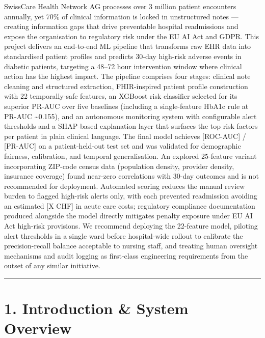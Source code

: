 \documentclass[11pt,a4paper]{article}
\begin{document}
SwissCare Health Network AG processes over 3 million patient encounters annually, yet 70\% of clinical information is locked in unstructured notes --- creating information gaps that drive preventable hospital readmissions and expose the organisation to regulatory risk under the EU AI Act and GDPR. This project delivers an end-to-end ML pipeline that transforms raw EHR data into standardised patient profiles and predicts 30-day high-risk adverse events in diabetic patients, targeting a 48--72 hour intervention window where clinical action has the highest impact. The pipeline comprises four stages: clinical note cleaning and structured extraction, FHIR-inspired patient profile construction with 22 temporally-safe features, an XGBoost risk classifier selected for its superior PR-AUC over five baselines (including a single-feature HbA1c rule at PR-AUC \textasciitilde{}0.155), and an autonomous monitoring system with configurable alert thresholds and a SHAP-based explanation layer that surfaces the top risk factors per patient in plain clinical language. The final model achieves [ROC-AUC] / [PR-AUC] on a patient-held-out test set and was validated for demographic fairness, calibration, and temporal generalisation. An explored 25-feature variant incorporating ZIP-code census data (population density, provider density, insurance coverage) found near-zero correlations with 30-day outcomes and is not recommended for deployment. Automated scoring reduces the manual review burden to flagged high-risk alerts only, with each prevented readmission avoiding an estimated [X CHF] in acute care costs; regulatory compliance documentation produced alongside the model directly mitigates penalty exposure under EU AI Act high-risk provisions. We recommend deploying the 22-feature model, piloting alert thresholds in a single ward before hospital-wide rollout to calibrate the precision-recall balance acceptable to nursing staff, and treating human oversight mechanisms and audit logging as first-class engineering requirements from the outset of any similar initiative.

\noindent\rule{\linewidth}{0.4pt}

\section{1. Introduction \& System Overview}
\end{document}
